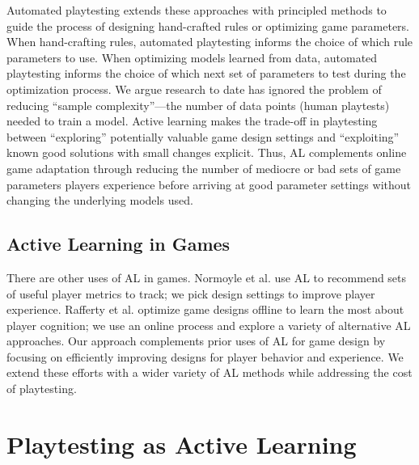 \documentclass{sig-alternate}
\begin{document}
Automated playtesting extends these approaches with principled methods to guide the process of designing hand-crafted rules or optimizing game parameters.
When hand-crafting rules, automated playtesting informs the choice of which rule parameters to use.
When optimizing models learned from data, automated playtesting informs the choice of which next set of parameters to test during the optimization process.
We argue research to date has ignored the problem of reducing ``sample complexity''---the number of data points (human playtests) needed to train a model.
Active learning makes the trade-off in playtesting between ``exploring'' potentially valuable game design settings and ``exploiting'' known good solutions with small changes explicit.
Thus, AL complements online game adaptation through reducing the number of mediocre or bad sets of game parameters players experience before arriving at good parameter settings without changing the underlying models used.




\subsection{Active Learning in Games}

There are other uses of AL in games.
Normoyle et al. \cite{normoyle2012:al-metrics} use AL to recommend sets of useful player metrics to track; we pick design settings to improve player experience.
Rafferty et al. \cite{rafferty2012:opt-cog-game} optimize game designs offline to learn the most about player cognition; we use an online process and explore a variety of alternative AL approaches.
Our approach complements prior uses of AL for game design by focusing on efficiently improving designs for player behavior and experience.
We extend these efforts with a wider variety of AL methods while addressing the cost of playtesting.



\section{Playtesting as Active Learning}
\end{document}

